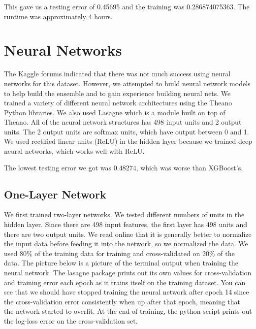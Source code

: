 \documentclass[twoside,11pt]{article}
\theoremstyle{definition}
\begin{document}
      This gave us a testing error of 0.45695 and the training was 0.286874075363. The runtime was approximately 4 hours.

\section{Neural Networks}
The Kaggle forums indicated that there was not much success using neural networks for this dataset. However, we attempted to build neural network models to help build the ensemble and to gain experience building neural nets. We trained a variety of different neural network architectures using the Theano Python libraries. We also used Lasagne which is a module built on top of Theano. All of the neural network structures has 498 input units and 2 output units. The 2 output units are softmax units, which have output between 0 and 1. We used rectified linear units (ReLU) in the hidden layer because we trained deep neural networks, which works well with ReLU. \cite{ReLU}

The lowest testing error we got was $0.48274$, which was worse than XGBoost's.

\subsection{One-Layer Network}
We first trained two-layer networks. We tested different numbers of units in the hidden layer. Since there are 498 input features, the first layer has 498 units and there are two output units. We read online that it is generally better to normalize the input data before feeding it into the network, so we normalized the data. We used 80\% of the training data for training and cross-validated on 20\% of the data. The picture below is a picture of the terminal output when training the neural network. The lasagne package prints out its own values for cross-validation and training error each epoch as it trains itself on the training dataset. You can see that we should have stopped training the neural network after epoch 14 since the cross-validation error consistently when up after that epoch, meaning that the network started to overfit. At the end of training, the python script prints out the log-loss error on the cross-validation set. 
\end{document}
